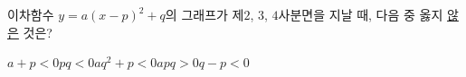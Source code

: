 이차함수 $y=a(x-p)^2+q$의 그래프가 제$2$, $3$, $4$사분면을 지날 때, 다음 중 옳지 \underline{않은} 것은? 
\begin{choices32}{$a+p<0$}{$pq<0$}{$aq^2+p<0$}{$apq>0$}{$q-p<0$}\end{choices32}
